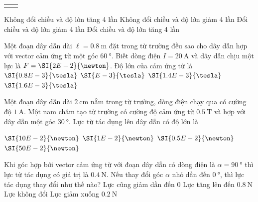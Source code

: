 \begin{ex}
\begin{center}
\begin{tabular}{M{8cm}M{8cm}}
			\label{fig:18P-12}
		\end{tabular}
	\end{center}
	\choice
	{Không đổi chiều và độ lớn tăng 4 lần}
	{\True Không đổi chiều và độ lớn giảm 4 lần}
	{Đổi chiều và độ lớn giảm 4 lần}
	{Đổi chiều và độ lớn tăng 4 lần}
\end{ex}


\begin{ex}
	Một đoạn dây dẫn dài $\ell=\SI{0.8}{\meter}$ đặt trong từ trường đều sao cho dây dẫn hợp với vector cảm ứng từ một góc $\SI{60}{\degree}$. Biết dòng điện $I=\SI{20}{\ampere}$ và dây dẫn chịu một lực là $F=\SI{2E-2}{\newton}$. Độ lớn của cảm ứng từ là
	\choice
	{$\SI{0.8E-3}{\tesla}$}
	{$\SI{E-3}{\tesla}$}
	{\True $\SI{1.4E-3}{\tesla}$}
	{$\SI{1.6E-3}{\tesla}$}
\end{ex}

\begin{ex}
	Một đoạn dây dẫn dài $\SI{2}{\centi\meter}$ nằm trong từ trường, dòng điện chạy qua có cường độ $\SI{1}{\ampere}$. Một nam châm tạo từ trường có cường độ cảm ứng từ $\SI{0.5}{\tesla}$ và hợp với dây dẫn một góc $\SI{30}{\degree}$. Lực từ tác dụng lên dây dẫn có độ lớn là
	
	\choice
	{$\SI{10E-2}{\newton}$}
	{$\SI{1E-2}{\newton}$}
	{\True $\SI{0.5E-2}{\newton}$}
	{$\SI{50E-2}{\newton}$}
\end{ex}
\begin{ex}
	Khi góc hợp bởi vector cảm ứng từ với đoạn dây dẫn có dòng điện là $\alpha=\SI{90}{\degree}$ thì lực từ tác dụng có giá trị là $\SI{0.4}{\newton}$. Nếu thay đổi góc $\alpha$ nhỏ dần đến $\SI{0}{\degree}$, thì lực tác dụng thay đổi như thế nào?
	\choice
	{\True Lực cũng giảm dần đến 0}
	{Lực tăng lên đến $\SI{0.8}{\newton}$}
	{Lực không đổi}
	{Lực giảm xuống $\SI{0.2}{\newton}$}
	\loigiai{}
\end{ex}

